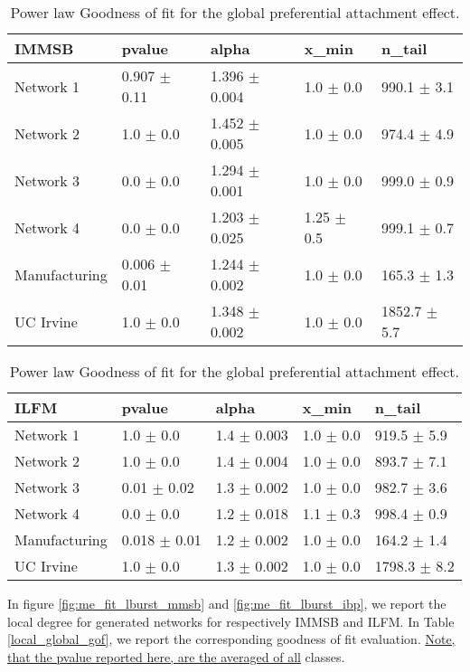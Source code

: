 \documentclass[a4paper, 12pt]{article}
\begin{document}
\begin{table}
    \label{table:global_gof}
    \caption{Power law Goodness of fit for the global preferential attachment effect.}
    \begin{tabular}{lllll}
    \hline
        \textbf{IMMSB} & pvalue          & alpha           & x\_min          & n\_tail           \\
    \hline
    Network 1     & 0.907 $\pm$ 0.11 & 1.396 $\pm$ 0.004 & 1.0 $\pm$ 0.0    & 990.1 $\pm$ 3.1  \\
    Network 2     & 1.0 $\pm$ 0.0     & 1.452 $\pm$ 0.005 & 1.0 $\pm$ 0.0    & 974.4 $\pm$ 4.9  \\
    Network 3     & 0.0 $\pm$ 0.0     & 1.294 $\pm$ 0.001 & 1.0 $\pm$ 0.0    & 999.0 $\pm$ 0.9 \\
    Network 4     & 0.0 $\pm$ 0.0     & 1.203 $\pm$ 0.025 & 1.25 $\pm$ 0.5 & 999.1 $\pm$ 0.7 \\
    Manufacturing & 0.006 $\pm$ 0.01 & 1.244 $\pm$ 0.002 & 1.0 $\pm$ 0.0    & 165.3 $\pm$ 1.3 \\
    UC Irvine     & 1.0 $\pm$ 0.0     & 1.348 $\pm$ 0.002 & 1.0 $\pm$ 0.0    & 1852.7 $\pm$ 5.7 \\
    \hline
    \end{tabular}

    \begin{tabular}{lllll}
    \hline
        \textbf{ILFM} & pvalue          & alpha           & x\_min       & n\_tail           \\
    \hline
    Network 1     & 1.0 $\pm$ 0.0     & 1.4 $\pm$ 0.003 & 1.0 $\pm$ 0.0 & 919.5 $\pm$ 5.9 \\
    Network 2     & 1.0 $\pm$ 0.0     & 1.4 $\pm$ 0.004 & 1.0 $\pm$ 0.0 & 893.7 $\pm$ 7.1  \\
    Network 3     & 0.01 $\pm$ 0.02  & 1.3 $\pm$ 0.002 & 1.0 $\pm$ 0.0 & 982.7 $\pm$ 3.6 \\
    Network 4     & 0.0 $\pm$ 0.0     & 1.2 $\pm$ 0.018 & 1.1 $\pm$ 0.3 & 998.4 $\pm$ 0.9 \\
    Manufacturing & 0.018 $\pm$ 0.01 & 1.2 $\pm$ 0.002 & 1.0 $\pm$ 0.0 & 164.2 $\pm$ 1.4 \\
    UC Irvine     & 1.0 $\pm$ 0.0     & 1.3 $\pm$ 0.002 & 1.0 $\pm$ 0.0 & 1798.3 $\pm$ 8.2 \\
    \hline
    \end{tabular}
\end{table}



In figure \ref{fig:me_fit_lburst_mmsb} and \ref{fig:me_fit_lburst_ibp}, we report the local degree for generated networks for respectively IMMSB and ILFM. In Table \ref{local_global_gof}, we report the corresponding goodness of fit evaluation. \underline{Note, that the pvalue reported here, are the averaged of all} classes.
\end{document}
